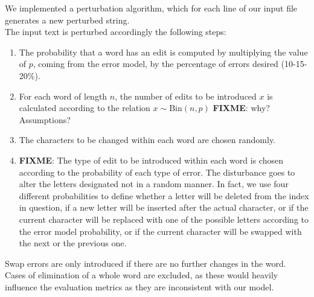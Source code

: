 We implemented a perturbation algorithm, which for each line of our input file generates a new perturbed string.\\
The input text is perturbed accordingly the following steps:

\begin{enumerate}
	\item The probability that a word has an edit is computed by multiplying the value of $p$, coming from the error model, 
	by the percentage of errors desired (10-15-20\%).
	\item For each word of length $n$, the number of edits to be introduced $x$ is calculated according to the relation $x 
	\sim \text{Bin}(n, p)$ \textbf{FIXME}: why? Assumptions?
	\item The characters to be changed within each word are chosen randomly.
	\item \textbf{FIXME}: The type of edit to be introduced within each word is chosen according to the probability of each 
	type of error.
	The disturbance goes to alter the letters designated not in a random manner. 
	In fact, we use four different probabilities to define whether a letter will be deleted from the index in question, if a new 
	letter will be inserted after the actual character, or if the current character will be replaced with one of the possible 
	letters according to the error model probability, or if the current character will be swapped with the next or the previous 
	one.
	
\end{enumerate}

Swap errors are only introduced if there are no further changes in the word. Cases of elimination of a whole word are 
excluded, as these would heavily influence the evaluation metrics as they are 
inconsistent with our model. 





